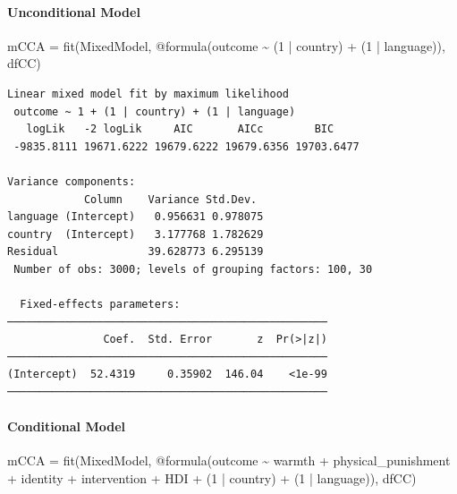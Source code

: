 \documentclass[
  letterpaper,
  DIV=11,
  numbers=noendperiod]{scrreprt}
\let\oldparagraph\paragraph
\renewcommand{\paragraph}[1]{\oldparagraph{#1}\mbox{}}
\newenvironment{Shaded}{\begin{snugshade}}{\end{snugshade}}
\newcommand{\FloatTok}[1]{\textcolor[rgb]{0.68,0.00,0.00}{#1}}
\newcommand{\FunctionTok}[1]{\textcolor[rgb]{0.28,0.35,0.67}{#1}}
\newcommand{\NormalTok}[1]{\textcolor[rgb]{0.00,0.23,0.31}{#1}}
\newcommand{\OperatorTok}[1]{\textcolor[rgb]{0.37,0.37,0.37}{#1}}
\newcommand{\PreprocessorTok}[1]{\textcolor[rgb]{0.68,0.00,0.00}{#1}}
\begin{document}
\paragraph{Unconditional Model}\label{unconditional-model-5}

\begin{Shaded}
\begin{Highlighting}[]
\NormalTok{mCCA }\OperatorTok{=} \FunctionTok{fit}\NormalTok{(MixedModel, }\PreprocessorTok{@formula}\NormalTok{(outcome }\OperatorTok{\textasciitilde{}} 
\NormalTok{                                 (}\FloatTok{1} \OperatorTok{|}\NormalTok{ country) }\OperatorTok{+} 
\NormalTok{                                 (}\FloatTok{1} \OperatorTok{|}\NormalTok{ language)), dfCC)}
\end{Highlighting}
\end{Shaded}

\begin{verbatim}
Linear mixed model fit by maximum likelihood
 outcome ~ 1 + (1 | country) + (1 | language)
   logLik   -2 logLik     AIC       AICc        BIC    
 -9835.8111 19671.6222 19679.6222 19679.6356 19703.6477

Variance components:
            Column    Variance Std.Dev. 
language (Intercept)   0.956631 0.978075
country  (Intercept)   3.177768 1.782629
Residual              39.628773 6.295139
 Number of obs: 3000; levels of grouping factors: 100, 30

  Fixed-effects parameters:
──────────────────────────────────────────────────
               Coef.  Std. Error       z  Pr(>|z|)
──────────────────────────────────────────────────
(Intercept)  52.4319     0.35902  146.04    <1e-99
──────────────────────────────────────────────────
\end{verbatim}

\paragraph{Conditional Model}\label{conditional-model-5}

\begin{Shaded}
\begin{Highlighting}[]
\NormalTok{mCCA }\OperatorTok{=} \FunctionTok{fit}\NormalTok{(MixedModel, }\PreprocessorTok{@formula}\NormalTok{(outcome }\OperatorTok{\textasciitilde{}}\NormalTok{ warmth }\OperatorTok{+} 
\NormalTok{                                 physical\_punishment }\OperatorTok{+} 
\NormalTok{                                 identity }\OperatorTok{+}\NormalTok{ intervention }\OperatorTok{+} 
\NormalTok{                                 HDI }\OperatorTok{+}
\NormalTok{                                 (}\FloatTok{1} \OperatorTok{|}\NormalTok{ country) }\OperatorTok{+} 
\NormalTok{                                 (}\FloatTok{1} \OperatorTok{|}\NormalTok{ language)), dfCC)}
\end{Highlighting}
\end{Shaded}
\end{document}
